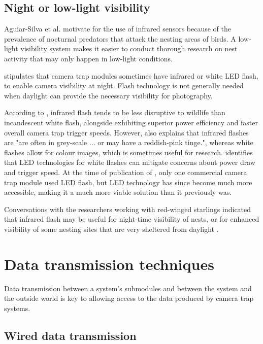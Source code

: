 \subsection{Night or low-light visibility}

Aguiar-Silva et al. \cite{aguiar-silva2017camera} motivate for the use of infrared sensors because of the prevalence of nocturnal predators that attack the nesting areas of birds. A low-light visibility system makes it easier to conduct thorough research on nest activity that may only happen in low-light conditions.

\cite{rovero2013which} stipulates that camera trap modules sometimes have infrared or white LED flash, to enable camera visibility at night. Flash technology is not generally needed when daylight can provide the necessary visibility for photography.

According to \cite{meek2012introduction}, infrared flash tends to be less disruptive to wildlife than incandescent white flash, alongside exhibiting superior power efficiency and faster overall camera trap trigger speeds. However, \cite{meek2012introduction} also explains that infrared flashes are "are often in grey-scale ... or may have a reddish-pink tinge.", whereas white flashes allow for colour images, which is sometimes useful for research. \cite{meek2012introduction} identifies that LED technologies for white flashes can mitigate concerns about power draw and trigger speed. At the time of publication of \cite{meek2012introduction}, only one commercial camera trap module used LED flash, but LED technology has since become much more accessible, making it a much more viable solution than it previously was.

Conversations with the researchers working with red-winged starlings indicated that infrared flash may be useful for night-time visibility of nests, or for enhanced visibility of some nesting sites that are very sheltered from daylight \cite{hofmeyer2024private}.


\section{Data transmission techniques}

Data transmission between a system's submodules and between the system and the outside world is key to allowing access to the data produced by camera trap systems.

\subsection{Wired data transmission}

